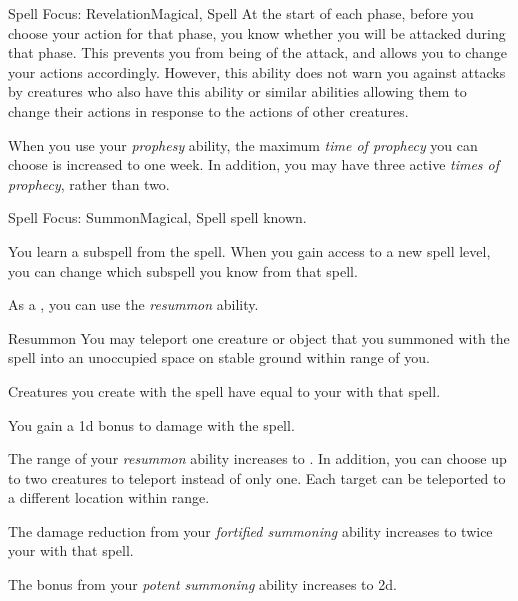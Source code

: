 \begin{feat}{Spell Focus: Revelation}{Magical, Spell}
         At the start of each phase, before you choose your action for that phase, you know whether you will be attacked during that phase.
        This prevents you from being \unaware of the attack, and allows you to change your actions accordingly.
        However, this ability does not warn you against attacks by creatures who also have this ability or similar abilities allowing them to change their actions in response to the actions of other creatures.

         When you use your \textit{prophesy} ability, the maximum \textit{time of prophecy} you can choose is increased to one week.
        In addition, you may have three active \textit{times of prophecy}, rather than two.
    \end{feat}

    \begin{feat}{Spell Focus: Summon}{Magical, Spell}
        \featpre {} spell known.

         You learn a subspell from the  spell.
        When you gain access to a new spell level, you can change which subspell you know from that spell.

         As a , you can use the \textit{resummon} ability.
        \begin{ability}{Resummon}
            You may teleport one creature or object that you summoned with the  spell into an unoccupied space on stable ground within \rngmed range of you.
        \end{ability}

         Creatures you create with the  spell have  equal to your  with that spell.

         You gain a \plus1d bonus to damage with the  spell.

         The range of your \textit{resummon} ability increases to \rnglong.
        In addition, you can choose up to two creatures to teleport instead of only one.
        Each target can be teleported to a different location within range.

         The damage reduction from your \textit{fortified summoning} ability increases to twice your  with that spell.

         The bonus from your \textit{potent summoning} ability increases to \plus2d.
    \end{feat}

